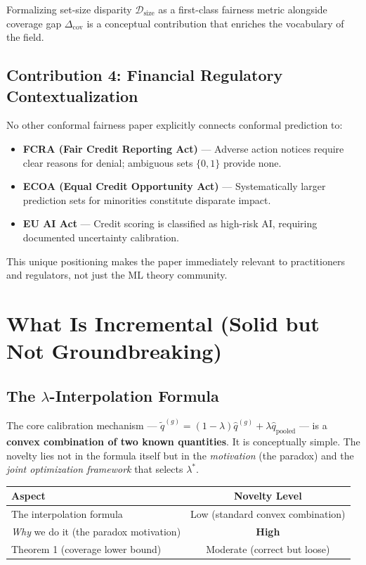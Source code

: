 \documentclass[11pt,a4paper]{article}
\begin{document}
Formalizing set-size disparity $\mathcal{D}_{\text{size}}$ as a first-class fairness metric alongside coverage gap $\Delta_{\text{cov}}$ is a conceptual contribution that enriches the vocabulary of the field.

\subsection{Contribution 4: Financial Regulatory Contextualization}

No other conformal fairness paper explicitly connects conformal prediction to:
\begin{itemize}[leftmargin=2em]
    \item \textbf{FCRA (Fair Credit Reporting Act)} --- Adverse action notices require clear reasons for denial; ambiguous sets $\{0,1\}$ provide none.
    \item \textbf{ECOA (Equal Credit Opportunity Act)} --- Systematically larger prediction sets for minorities constitute disparate impact.
    \item \textbf{EU AI Act} --- Credit scoring is classified as high-risk AI, requiring documented uncertainty calibration.
\end{itemize}

This unique positioning makes the paper immediately relevant to practitioners and regulators, not just the ML theory community.

\section{What Is Incremental (Solid but Not Groundbreaking)}
\label{sec:incremental}

\subsection{The $\lambda$-Interpolation Formula}

The core calibration mechanism --- $\tilde{q}^{(g)} = (1-\lambda)\hat{q}^{(g)} + \lambda\hat{q}_{\text{pooled}}$ --- is a \textbf{convex combination of two known quantities}. It is conceptually simple. The novelty lies not in the formula itself but in the \emph{motivation} (the paradox) and the \emph{joint optimization framework} that selects $\lambda^*$.

\begin{center}
\small
\begin{tabular}{@{}lc@{}}
\toprule
\textbf{Aspect} & \textbf{Novelty Level} \\
\midrule
The interpolation formula & Low (standard convex combination) \\
\emph{Why} we do it (the paradox motivation) & \textbf{High} \\
Theorem 1 (coverage lower bound) & Moderate (correct but loose) \\
\bottomrule
\end{tabular}
\end{center}
\end{document}
